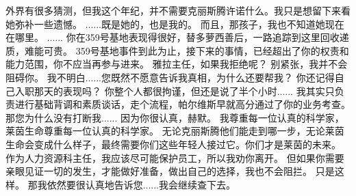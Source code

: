 \documentclass[openany]{book}
\begin{document}
\begin{dialogue}
     外界有很多猜测，但我这个年纪，并不需要克丽斯腾许诺什么。我只是想留下来看她弥补一些遗憾。
     ......既是她的，也是我的。
     而且，那孩子，我也不知道她现在在哪里。
     ......
     你在359号基地表现得很好，替多萝西善后，一路追踪到这里回收递质，难能可贵。
     359号基地事件到此为止，接下来的事情，已经超出了你的权责和能力范围，你不应当再参与进来。
     雅拉主任，如果我拒绝呢？
     别紧张，我并不会阻碍你。
     我不明白......您既然不愿意告诉我真相，为什么还要帮我？
     你还记得自己入职那天的表现吗？
     你整个人都很拘谨，但还是说了半个小时......
     我其实只负责进行基础背调和素质谈话，走个流程，帕尔维斯早就高分通过了你的业务考查。
     那您为什么没有打断我......
     因为你很认真，赫默。
     我尊重每一位认真的科学家，莱茵生命尊重每一位认真的科学家。
     无论克丽斯腾他们能走到哪一步，无论莱茵生命会变成什么样子，最终需要你们这些年轻人接过它。你们才是莱茵的未来。
     作为人力资源科主任，我应该尽可能保护员工，所以我劝你离开。
     但如果你需要亲眼见证一切的发生，才能做好准备，做出自己的选择，我也不会阻拦。
     只是这样。
     那我依然要很认真地告诉您......我会继续查下去。
\end{dialogue}
\end{document}
